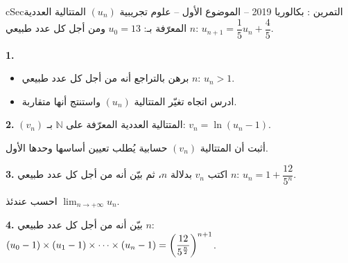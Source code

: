 \documentclass[12pt,a4paper]{article}
\newenvironment{BOX}[2]{\begin{otherlanguage}{english}\begin{arbox}{#1}{#2}}{\end{arbox}\end{otherlanguage}}
\newcounter{exo}
\newenvironment{tamrin}[1]{\stepcounter{exo}\begin{BOX}{cSec}{التمرين \theexo: #1}}{\end{BOX}}
\renewcommand{\cdots}{\mathinner{\cdotp\cdotp\cdotp}}
\newcommand{\N}{\mathbb{N}}
\newcommand{\limn}{\displaystyle\lim_{n\to+\infty}}
\newenvironment{sq}{\begin{itemize}[leftmargin=2.4em,itemsep=3pt]}{\end{itemize}}
\newcommand{\qa}{\item[(أ)]}\newcommand{\qb}{\item[(ب)]}\newcommand{\qc}{\item[(جـ)]}\newcommand{\qd}{\item[(د)]}\newcommand{\qe}{\item[(هـ)]}
\newcommand{\QQ}[1]{\par\smallskip\textbf{#1.} }
\begin{document}
\begin{tamrin}{بكالوريا 2019 -- الموضوع الأول -- علوم تجريبية}
$(u_n)$ المتتالية العددية المعرّفة بـ: $u_0=13$ ومن أجل كل عدد طبيعي $n$: $u_{n+1}=\dfrac{1}{5}u_n+\dfrac{4}{5}$.
\QQ{1}
\begin{sq}
\qa برهن بالتراجع أنه من أجل كل عدد طبيعي $n$: $u_n>1$.
\qb ادرس اتجاه تغيّر المتتالية $(u_n)$ واستنتج أنها متقاربة.
\end{sq}
\QQ{2} $(v_n)$ المتتالية العددية المعرّفة على $\N$ بـ: $v_n=\ln\left(u_n-1\right)$.

أثبت أن المتتالية $(v_n)$ حسابية يُطلب تعيين أساسها وحدها الأول.
\QQ{3} اكتب $v_n$ بدلالة $n$، ثم بيّن أنه من أجل كل عدد طبيعي $n$: $u_n=1+\dfrac{12}{5^n}$.

احسب عندئذ $\limn u_n$.
\QQ{4} بيّن أنه من أجل كل عدد طبيعي $n$: $\left(u_0-1\right)\times\left(u_1-1\right)\times\cdots\times\left(u_n-1\right)=\left(\dfrac{12}{5^{\frac{n}{2}}}\right)^{n+1}$.
\end{tamrin}
\end{document}

